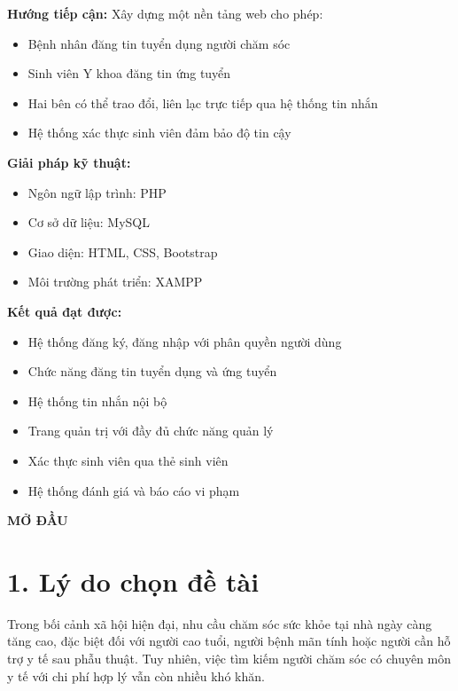 \documentclass[a4paper,12pt]{report}
\begin{document}
\textbf{Hướng tiếp cận:} Xây dựng một nền tảng web cho phép:
\begin{itemize}
    \item Bệnh nhân đăng tin tuyển dụng người chăm sóc
    \item Sinh viên Y khoa đăng tin ứng tuyển
    \item Hai bên có thể trao đổi, liên lạc trực tiếp qua hệ thống tin nhắn
    \item Hệ thống xác thực sinh viên đảm bảo độ tin cậy
\end{itemize}

\textbf{Giải pháp kỹ thuật:}
\begin{itemize}
    \item Ngôn ngữ lập trình: PHP
    \item Cơ sở dữ liệu: MySQL
    \item Giao diện: HTML, CSS, Bootstrap
    \item Môi trường phát triển: XAMPP
\end{itemize}

\textbf{Kết quả đạt được:}
\begin{itemize}
    \item Hệ thống đăng ký, đăng nhập với phân quyền người dùng
    \item Chức năng đăng tin tuyển dụng và ứng tuyển
    \item Hệ thống tin nhắn nội bộ
    \item Trang quản trị với đầy đủ chức năng quản lý
    \item Xác thực sinh viên qua thẻ sinh viên
    \item Hệ thống đánh giá và báo cáo vi phạm
\end{itemize}

\newpage
{}
\begin{center}
\textbf{\Large MỞ ĐẦU}
\end{center}
\vspace{1cm}

\section*{1. Lý do chọn đề tài}

Trong bối cảnh xã hội hiện đại, nhu cầu chăm sóc sức khỏe tại nhà ngày càng tăng cao, đặc biệt đối với người cao tuổi, người bệnh mãn tính hoặc người cần hỗ trợ y tế sau phẫu thuật. Tuy nhiên, việc tìm kiếm người chăm sóc có chuyên môn y tế với chi phí hợp lý vẫn còn nhiều khó khăn.
\end{document}
